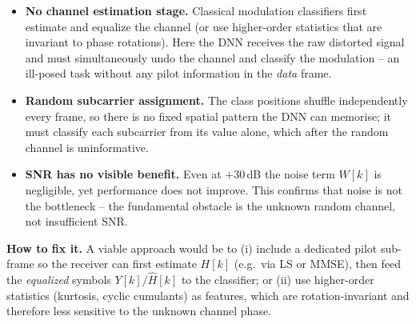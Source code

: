 \documentclass[12pt,a4paper,onecolumn]{exam}
\begin{document}
\begin{solution}
\begin{itemize}
  \item \textbf{No channel estimation stage.}
    Classical modulation classifiers first estimate and equalize the channel
    (or use higher-order statistics that are invariant to phase rotations).
    Here the DNN receives the raw distorted signal and must simultaneously
    undo the channel and classify the modulation -- an ill-posed task without
    any pilot information in the \emph{data} frame.

  \item \textbf{Random subcarrier assignment.}
    The class positions shuffle independently every frame, so there is no
    fixed spatial pattern the DNN can memorise; it must classify each
    subcarrier from its value alone, which after the random channel is
    uninformative.

  \item \textbf{SNR has no visible benefit.}
    Even at $+30$\,dB the noise term $W[k]$ is negligible, yet performance
    does not improve.  This confirms that noise is not the bottleneck -- the
    fundamental obstacle is the unknown random channel, not insufficient SNR.
\end{itemize}

\noindent\textbf{How to fix it.}
A viable approach would be to (i) include a dedicated pilot sub-frame so
the receiver can first estimate $H[k]$ (e.g.\ via LS or MMSE), then feed
the \emph{equalized} symbols $Y[k]/\hat{H}[k]$ to the classifier; or
(ii) use higher-order statistics (kurtosis, cyclic cumulants) as features,
which are rotation-invariant and therefore less sensitive to the unknown
channel phase.

\end{solution}
\end{document}
